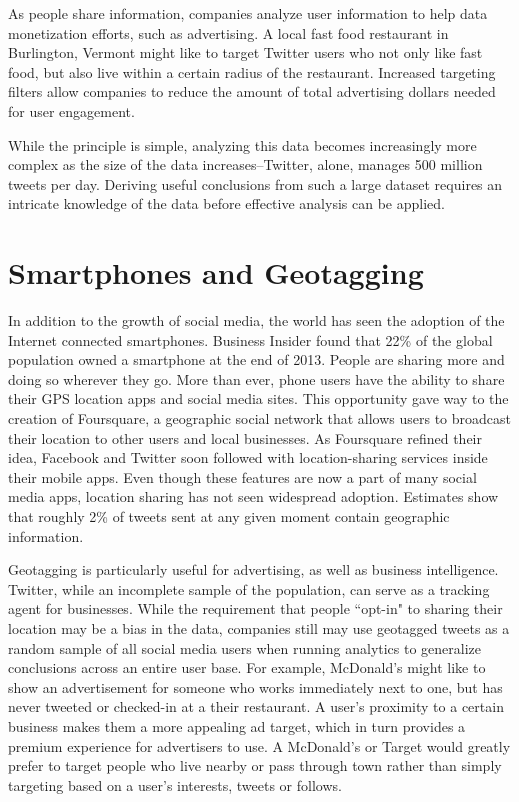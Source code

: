 \documentclass[midd]{thesis}
\begin{document}
As people share information, companies analyze user information to help data monetization efforts, such as advertising. A local fast food restaurant in Burlington, Vermont might like to target Twitter users who not only like fast food, but also live within a certain radius of the restaurant. Increased targeting filters allow companies to reduce the amount of total advertising dollars needed for user engagement. 

While the principle is simple, analyzing this data becomes increasingly more complex as the size of the data increases--Twitter, alone, manages 500 million tweets per day. Deriving useful conclusions from such a large dataset requires an intricate knowledge of the data before effective analysis can be applied.

\section{Smartphones and Geotagging}
In addition to the growth of social media, the world has seen the adoption of the Internet connected smartphones. Business Insider found that 22\% of the global population owned a smartphone at the end of 2013\cite{businessinsider}. People are sharing more and doing so wherever they go. More than ever, phone users have the ability to share their GPS location apps and social media sites. This opportunity gave way to the creation of Foursquare, a geographic social network that allows users to broadcast their location to other users and local businesses. As Foursquare refined their idea, Facebook and Twitter soon followed with location-sharing services inside their mobile apps. Even though these features are now a part of many social media apps, location sharing has not seen widespread adoption. Estimates show that roughly 2\% of tweets sent at any given moment contain geographic information.\cite{heartbeat:leetaru}

Geotagging is particularly useful for advertising, as well as business intelligence. Twitter, while an incomplete sample of the population, can serve as a tracking agent for businesses. While the requirement that people ``opt-in" to sharing their location may be a bias in the data, companies still may use geotagged tweets as a random sample of all social media users when running analytics to generalize conclusions across an entire user base. For example, McDonald's might like to show an advertisement for someone who works immediately next to one, but has never tweeted or checked-in at a their restaurant. A user's proximity to a certain business makes them a more appealing ad target, which in turn provides a premium experience for advertisers to use. A McDonald's or Target would greatly prefer to target people who live nearby or pass through town rather than simply targeting based on a user's interests, tweets or follows.
\end{document}
